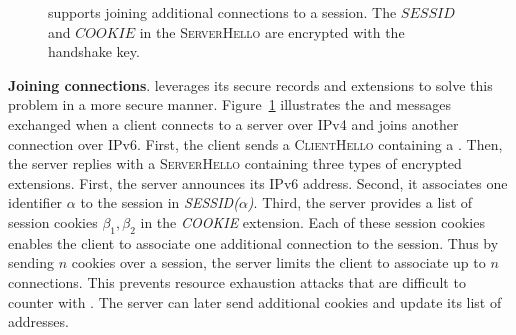 \begin{figure}[!t]
	\centering
	\caption{\tcpls supports joining additional \tcp
		connections to a \tcpls session. The $SESSID$ and $COOKIE$ in the \textmd{\textsc{ServerHello}} are encrypted with the
		handshake key.}
	\label{fig:join-example}
\end{figure}


\textbf{Joining \tcp connections}. \tcpls leverages its secure records and extensions
to solve this problem in a more secure
manner. Figure~\ref{fig:join-example} illustrates the \tls and \tcpls messages 
exchanged when a client connects to a server over IPv4 and joins another connection
over IPv6.
First, the client sends a \textsc{ClientHello} containing a \hello.
Then, the server replies with a \textsc{ServerHello}
containing three types of encrypted extensions. First, the server announces its IPv6 address.
Second, it associates one identifier $\alpha$ to the \tcpls session in \emph{SESSID($\alpha$)}. 
Third, the server provides a list
of \tcpls session cookies $\beta_1,\beta_2$ in the \emph{COOKIE} extension.
Each of these session cookies enables the client
to associate one additional \tcp connection to the \tcpls session. Thus by sending $n$
cookies over a session, the server limits the client to associate up to
$n$ \tcp connections. This prevents resource exhaustion attacks
that are difficult to counter with \mptcp. The server can later send additional
cookies and update its list of addresses.

